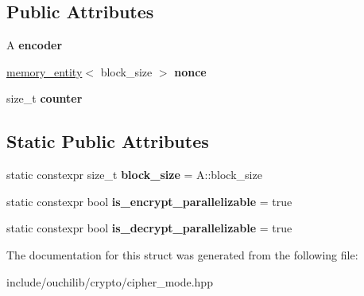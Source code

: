 \subsection*{Public Attributes}
\begin{DoxyCompactItemize}
\item 
\mbox{\label{structouchi_1_1crypto_1_1ctr_aad96b2b9980ae4f7bde03e06e2fcc556}} 
A {\bfseries encoder}
\item 
\mbox{\label{structouchi_1_1crypto_1_1ctr_a30e9b87b0aff0ea0a1721231834b9c6e}} 
\mbox{\hyperlink{structouchi_1_1crypto_1_1memory__entity}{memory\+\_\+entity}}$<$ block\+\_\+size $>$ {\bfseries nonce}
\item 
\mbox{\label{structouchi_1_1crypto_1_1ctr_ac98249e3a51656425fc05304dcaa670d}} 
size\+\_\+t {\bfseries counter}
\end{DoxyCompactItemize}
\subsection*{Static Public Attributes}
\begin{DoxyCompactItemize}
\item 
\mbox{\label{structouchi_1_1crypto_1_1ctr_a906485a06e3e0f2cdea347e19a701473}} 
static constexpr size\+\_\+t {\bfseries block\+\_\+size} = A\+::block\+\_\+size
\item 
\mbox{\label{structouchi_1_1crypto_1_1ctr_a81e38d13470c87b8fcd898564b8dab40}} 
static constexpr bool {\bfseries is\+\_\+encrypt\+\_\+parallelizable} = true
\item 
\mbox{\label{structouchi_1_1crypto_1_1ctr_adfa302d66fd8ed79b308957df0b1a487}} 
static constexpr bool {\bfseries is\+\_\+decrypt\+\_\+parallelizable} = true
\end{DoxyCompactItemize}


The documentation for this struct was generated from the following file\+:\begin{DoxyCompactItemize}
\item 
include/ouchilib/crypto/cipher\+\_\+mode.\+hpp\end{DoxyCompactItemize}
